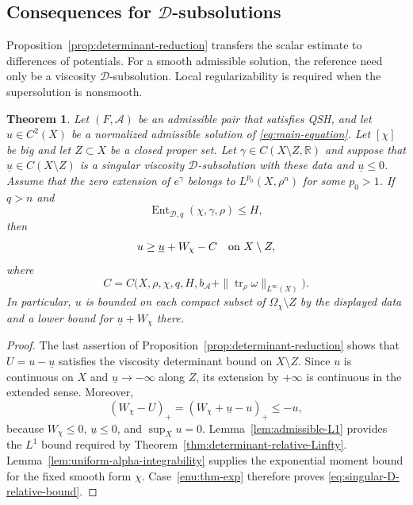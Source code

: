 \documentclass[oneside,english,letterpaper]{amsart}
\numberwithin{equation}{section}
\theoremstyle{plain}
\newtheorem{thm}{Theorem}[section]
\theoremstyle{definition}
\theoremstyle{remark}
\begin{document}
\subsection{Consequences for \texorpdfstring{$\mathcal D$}{D}-subsolutions}
\label{subsec:singular-D-relative-estimate}

Proposition~\ref{prop:determinant-reduction} transfers the scalar
estimate to differences of potentials. For a smooth admissible
solution, the reference need only be a viscosity
$\mathcal D$-subsolution. Local regularizability is required when
the supersolution is nonsmooth.

\begin{thm}
	\label{thm:singular-D-relative-Linfty}
	Let $(F,\mathcal A)$ be an admissible pair that satisfies QSH, and let $u\in C^2(X)$
	be a normalized admissible solution of \eqref{eq:main-equation}.
	Let $[\chi]$ be big and let $Z\subset X$ be a closed proper set.
	Let $\gamma\in C(X\setminus Z,\mathbb R)$ and suppose that
	$\underline u\in C(X\setminus Z)$ is a singular viscosity
	$\mathcal D$-subsolution with these data and $\underline u\leq0$.
	Assume that the zero extension
	of $e^\gamma$ belongs to $L^{p_0}(X,\rho^n)$ for some $p_0>1$.
	If $q>n$ and
	$$
	\operatorname{Ent}_{\mathcal D,q}(\chi,\gamma,\rho)\leq H,
	$$
	then
	\begin{equation}
		\label{eq:singular-D-relative-bound}
		u\geq\underline u+W_\chi-C
		\quad\hbox{on }X\setminus Z,
	\end{equation}
	where
	$$
	C=C\bigl(X,\rho,\chi,q,H,
	b_{\mathcal A}+\|\operatorname{tr}_\rho\omega\|_{L^\infty(X)}\bigr).
	$$
	In particular, $u$ is bounded on each compact subset of
	$\Omega_\chi\setminus Z$ by the displayed data and a lower bound
	for $\underline u+W_\chi$ there.
\end{thm}

\begin{proof}
	The last assertion of Proposition~\ref{prop:determinant-reduction}
	shows that $U=u-\underline u$ satisfies the viscosity determinant
	bound on $X\setminus Z$. Since $u$ is continuous on $X$ and
	$\underline u\to-\infty$ along $Z$, its extension by $+\infty$
	is continuous in the extended sense. Moreover,
	$$
	(W_\chi-U)_+=(W_\chi+\underline u-u)_+\leq-u,
	$$
	because $W_\chi\leq0$, $\underline u\leq0$, and $\sup_Xu=0$.
	Lemma~\ref{lem:admissible-L1}
	provides the $L^1$ bound
	required by Theorem~\ref{thm:determinant-relative-Linfty}.
	Lemma~\ref{lem:uniform-alpha-integrability} supplies the exponential
	moment bound for the fixed smooth form $\chi$. Case~\ref{enu:thm-exp}
	therefore proves \eqref{eq:singular-D-relative-bound}.
\end{proof}
\end{document}

